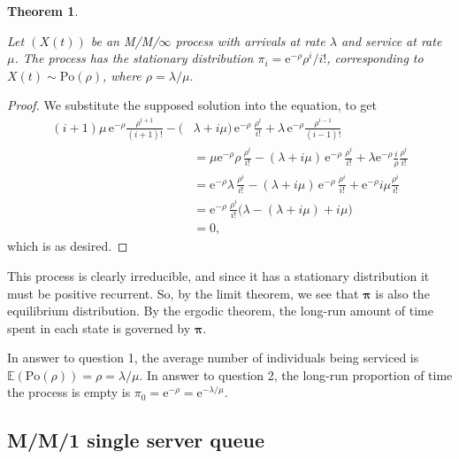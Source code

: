 \documentclass[
  a4paper,
]{article}
\newtheorem{theorem}{Theorem}[section]
\theoremstyle{definition}
\theoremstyle{definition}
\theoremstyle{definition}
\theoremstyle{remark}
\begin{document}
\begin{theorem}
\protect\hypertarget{thm:MMinf-thm}{}\label{thm:MMinf-thm}

Let \((X(t))\) be an M/M/\(\infty\) process with arrivals at rate \(\lambda\) and service at rate \(\mu\). The process has the stationary distribution \(\pi_i = \mathrm{e}^{-\rho} \rho^i / i!\), corresponding to \(X(t) \sim \mathrm{Po}(\rho)\), where \(\rho = \lambda/\mu\).

\end{theorem}

\begin{proof}

We substitute the supposed solution into the equation, to get
\begin{align*}
  (i+1)\mu \,\mathrm{e}^{-\rho} \frac{\rho^{i+1}}{(i+1)!} -(&\lambda + i\mu) \,\mathrm{e}^{-\rho} \,\frac{\rho^i}{i!} + \lambda\, \mathrm{e}^{-\rho} \frac{\rho^{i-1}}{(i-1)!} \\
  &= \mu \mathrm{e}^{-\rho} \rho \,\frac{\rho^i}{i!} -(\lambda + i\mu) \,\mathrm{e}^{-\rho} \,\frac{\rho^i}{i!} + \lambda \mathrm{e}^{-\rho}  \frac{i}{\rho} \frac{\rho^i}{i!} \\
  &= \mathrm{e}^{-\rho} \lambda \,\frac{\rho^i}{i!} -(\lambda + i\mu) \,\mathrm{e}^{-\rho} \,\frac{\rho^i}{i!} + \mathrm{e}^{-\rho} i\mu \frac{\rho^i}{i!} \\
  &= \mathrm{e}^{-\rho} \,\frac{\rho^i}{i!} \big( \lambda - (\lambda + i \mu) + i \mu   \big)  \\
  &= 0 ,
\end{align*}
which is as desired.

\end{proof}

This process is clearly irreducible, and since it has a stationary distribution it must be positive recurrent. So, by the limit theorem, we see that \(\boldsymbol\pi\) is also the equilibrium distribution. By the ergodic theorem, the long-run amount of time spent in each state is governed by \(\boldsymbol\pi\).

In answer to question 1, the average number of individuals being serviced is \(\mathbb E (\text{Po}(\rho)) = \rho = \lambda/\mu\). In answer to question 2, the long-run proportion of time the process is empty is \(\pi_0 = \mathrm{e}^{-\rho} = \mathrm{e}^{-\lambda/\mu}\).

\hypertarget{MM1}{%
\subsection{M/M/1 single server queue}\label{MM1}}
\end{document}
